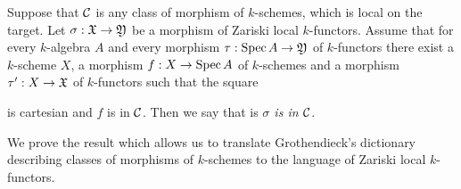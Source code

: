 \begin{definition}
Suppose that ${\mathcal C}$ is any class of morphism of $k$-schemes, which is local on the target. Let $\sigma:{\mathfrak X}\rightarrow {\mathfrak Y}$ be a morphism of Zariski local $k$-functors. Assume that for every $k$-algebra $A$ and every morphism $\tau:\mathrm{Spec}\, A\rightarrow {\mathfrak Y}$ of $k$-functors there exist a $k$-scheme $X$, a morphism $f:X\rightarrow \mathrm{Spec}\, A$ of $k$-schemes and a morphism $\tau':X\rightarrow {\mathfrak X}$ of $k$-functors such that the square
\begin{center}
\end{center}
is cartesian and $f$ is in ${\mathcal C}$. Then we say that is \textit{$\sigma$ is in ${\mathcal C}$}.
\end{definition}
\noindent
We prove the result which allows us to translate Grothendieck's dictionary describing classes of morphisms of $k$-schemes to the language of Zariski local $k$-functors.

